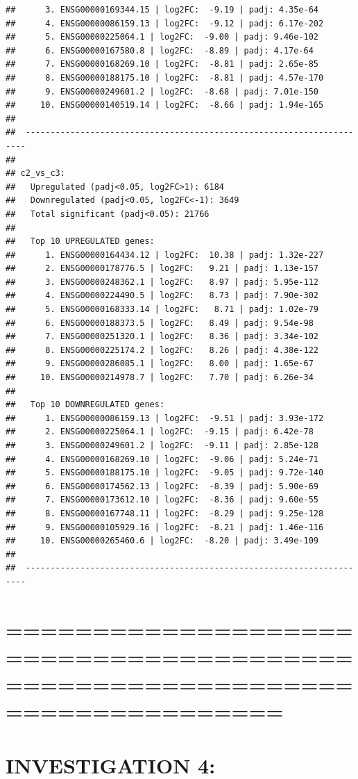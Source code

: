 \documentclass[
]{article}
\begin{document}
\begin{verbatim}
##      3. ENSG00000169344.15 | log2FC:  -9.19 | padj: 4.35e-64
##      4. ENSG00000086159.13 | log2FC:  -9.12 | padj: 6.17e-202
##      5. ENSG00000225064.1 | log2FC:  -9.00 | padj: 9.46e-102
##      6. ENSG00000167580.8 | log2FC:  -8.89 | padj: 4.17e-64
##      7. ENSG00000168269.10 | log2FC:  -8.81 | padj: 2.65e-85
##      8. ENSG00000188175.10 | log2FC:  -8.81 | padj: 4.57e-170
##      9. ENSG00000249601.2 | log2FC:  -8.68 | padj: 7.01e-150
##     10. ENSG00000140519.14 | log2FC:  -8.66 | padj: 1.94e-165
## 
##  ---------------------------------------------------------------------- 
## 
## c2_vs_c3:
##   Upregulated (padj<0.05, log2FC>1): 6184
##   Downregulated (padj<0.05, log2FC<-1): 3649
##   Total significant (padj<0.05): 21766
## 
##   Top 10 UPREGULATED genes:
##      1. ENSG00000164434.12 | log2FC:  10.38 | padj: 1.32e-227
##      2. ENSG00000178776.5 | log2FC:   9.21 | padj: 1.13e-157
##      3. ENSG00000248362.1 | log2FC:   8.97 | padj: 5.95e-112
##      4. ENSG00000224490.5 | log2FC:   8.73 | padj: 7.90e-302
##      5. ENSG00000168333.14 | log2FC:   8.71 | padj: 1.02e-79
##      6. ENSG00000188373.5 | log2FC:   8.49 | padj: 9.54e-98
##      7. ENSG00000251320.1 | log2FC:   8.36 | padj: 3.34e-102
##      8. ENSG00000225174.2 | log2FC:   8.26 | padj: 4.38e-122
##      9. ENSG00000286085.1 | log2FC:   8.00 | padj: 1.65e-67
##     10. ENSG00000214978.7 | log2FC:   7.70 | padj: 6.26e-34
## 
##   Top 10 DOWNREGULATED genes:
##      1. ENSG00000086159.13 | log2FC:  -9.51 | padj: 3.93e-172
##      2. ENSG00000225064.1 | log2FC:  -9.15 | padj: 6.42e-78
##      3. ENSG00000249601.2 | log2FC:  -9.11 | padj: 2.85e-128
##      4. ENSG00000168269.10 | log2FC:  -9.06 | padj: 5.24e-71
##      5. ENSG00000188175.10 | log2FC:  -9.05 | padj: 9.72e-140
##      6. ENSG00000174562.13 | log2FC:  -8.39 | padj: 5.90e-69
##      7. ENSG00000173612.10 | log2FC:  -8.36 | padj: 9.60e-55
##      8. ENSG00000167748.11 | log2FC:  -8.29 | padj: 9.25e-128
##      9. ENSG00000105929.16 | log2FC:  -8.21 | padj: 1.46e-116
##     10. ENSG00000265460.6 | log2FC:  -8.20 | padj: 3.49e-109
## 
##  ----------------------------------------------------------------------
\end{verbatim}

\section{============================================================================}\label{section-15}

\section{INVESTIGATION 4:}\label{investigation-4}
\end{document}
